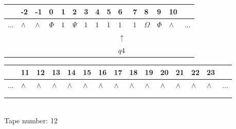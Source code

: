 \documentclass[11pt]{article}
\begin{document}
\begin{table}[H]
\centering
\begin{tabular}{lllllllllllllll}
 & -2 & -1 & 0 & 1 & 2 & 3 & 4 & 5 & 6 & 7 & 8 & 9 & 10 & \\
\hline
$...$ & \multicolumn{1}{|l|}{$\wedge$} & \multicolumn{1}{|l|}{$\wedge$} & \multicolumn{1}{|l|}{$\Phi$} & \multicolumn{1}{|l|}{$1$} & \multicolumn{1}{|l|}{$\Psi$} & \multicolumn{1}{|l|}{$1$} & \multicolumn{1}{|l|}{$1$} & \multicolumn{1}{|l|}{$1$} & \multicolumn{1}{|l|}{$1$} & \multicolumn{1}{|l|}{$1$} & \multicolumn{1}{|l|}{$\Omega$} & \multicolumn{1}{|l|}{$\Phi$} & \multicolumn{1}{|l|}{$\wedge$} & $...$\\
\hline
&  &  &  &  &  &  &  &  & $\uparrow$ &  &  &  &  &  \\
&  &  &  &  &  &  &  &  & $ q4 $ &  &  &  &  &  \\
\end{tabular}
\begin{tabular}{lllllllllllllll}
 & 11 & 12 & 13 & 14 & 15 & 16 & 17 & 18 & 19 & 20 & 21 & 22 & 23 & \\
\hline
$...$ & \multicolumn{1}{|l|}{$\wedge$} & \multicolumn{1}{|l|}{$\wedge$} & \multicolumn{1}{|l|}{$\wedge$} & \multicolumn{1}{|l|}{$\wedge$} & \multicolumn{1}{|l|}{$\wedge$} & \multicolumn{1}{|l|}{$\wedge$} & \multicolumn{1}{|l|}{$\wedge$} & \multicolumn{1}{|l|}{$\wedge$} & \multicolumn{1}{|l|}{$\wedge$} & \multicolumn{1}{|l|}{$\wedge$} & \multicolumn{1}{|l|}{$\wedge$} & \multicolumn{1}{|l|}{$\wedge$} & \multicolumn{1}{|l|}{$\wedge$} & $...$\\
\hline
&  &  &  &  &  &  &  &  &  &  &  &  &  &  \\
&  &  &  &  &  &  &  &  &  &  &  &  &  &  \\
\end{tabular}
\\
Tape number: 12
\noindent\makebox[\linewidth]{\hdashrule{\textwidth}{1pt}{1pt}}\end{table}
\end{document}
